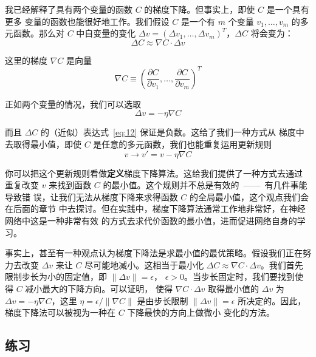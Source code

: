 我已经解释了具有两个变量的函数 $C$ 的梯度下降。但事实上，即使 $C$ 是一个具有更多
变量的函数也能很好地工作。我们假设 $C$ 是一个有 $m$ 个变量 $v_1,\ldots,v_m$ 的多
元函数。那么对 $C$ 中自变量的变化 $\Delta v = (\Delta v_1, \ldots, \Delta
v_m)^T$，$\Delta C$ 将会变为：
\begin{equation}
  \Delta C \approx \nabla C \cdot \Delta v
  \label{eq:12}\tag{12}
\end{equation}

这里的梯度 $\nabla C$ 是向量
\begin{equation}
  \nabla C \equiv \left(\frac{\partial C}{\partial v_1}, \ldots,
    \frac{\partial C}{\partial v_m}\right)^T
  \label{eq:13}\tag{13}
\end{equation}

正如两个变量的情况，我们可以选取
\begin{equation}
  \Delta v = -\eta \nabla C
  \label{eq:14}\tag{14}
\end{equation}

而且 $\Delta C$ 的（近似）表达式~\eqref{eq:12} 保证是负数。这给了我们一种方式从
梯度中去取得最小值，即使 $C$ 是任意的多元函数，我们也能重复运用更新规则
\begin{equation}
  v \rightarrow v' = v-\eta \nabla C
  \label{eq:15}\tag{15}
\end{equation}

你可以把这个更新规则看做\textbf{定义}梯度下降算法。这给我们提供了一种方式去通过
重复改变 $v$ 来找到函数 $C$ 的最小值。这个规则并不总是有效的~——~有几件事能导致错
误，让我们无法从梯度下降来求得函数 $C$ 的全局最小值，这个观点我们会在后面的章节
中去探讨。但在实践中，梯度下降算法通常工作地非常好，在神经网络中这是一种非常有效
的方式去求代价函数的最小值，进而促进网络自身的学习。

事实上，甚至有一种观点认为梯度下降法是求最小值的最优策略。假设我们正在努力去改变
$\Delta v$ 来让 $C$ 尽可能地减小。这相当于最小化 $\Delta C \approx \nabla C
\cdot \Delta v$。我们首先限制步长为小的固定值，即 $\| \Delta v \| = \epsilon$，
$\epsilon > 0$。当步长固定时，我们要找到使得 $C$ 减小最大的下降方向。可以证明，
使得 $\nabla C \cdot \Delta v$ 取得最小值的 $\Delta v$ 为 $\Delta v = - \eta
\nabla C$，这里 $\eta = \epsilon / \|\nabla C\|$ 是由步长限制 $\|\Delta v\| =
\epsilon$ 所决定的。因此，梯度下降法可以被视为一种在 $C$ 下降最快的方向上做微小
变化的方法。

\subsection*{练习}

